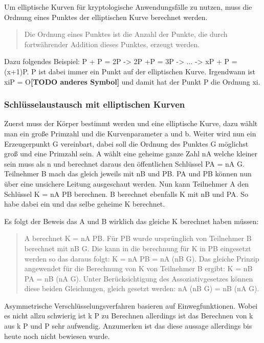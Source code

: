 		Um elliptische Kurven für kryptologische Anwendungsfälle zu nutzen, muss die Ordnung eines Punktes der elliptischen Kurve berechnet werden.
		
		\begin{quote}
			\begin{defi}
				Die Ordnung eines Punktes ist die Anzahl der Punkte, die durch fortwährender Addition dieses Punktes, erzeugt werden.\cite{Information:und:Kommunikation}
			\end{defi}
		\end{quote}
		
		Dazu folgendes Beispiel: P + P = 2P -> 2P +P = 3P -> ... -> xP + P = (x+1)P. P ist dabei immer ein Punkt auf der elliptischen Kurve. Irgendwann ist xiP = O\textbf{[TODO anderes Symbol]} und damit hat der Punkt P die Ordnung xi.
		
		\subsubsection{Schlüsselaustausch mit elliptischen Kurven}
			Zuerst muss der Körper bestimmt werden und eine elliptische Kurve, dazu wählt man ein große Primzahl und die Kurvenparameter a und b. Weiter wird nun ein Erzeugerpunkt G vereinbart, dabei soll die Ordnung des Punktes G möglichst groß und eine Primzahl sein. A wählt eine geheime ganze Zahl nA welche kleiner sein muss als n und berechnet daraus den öffentlichen Schlüssel PA = nA \mycdot G. Teilnehmer B mach das gleich jeweils mit nB und PB. PA und PB können nun über eine unsichere Leitung ausgeschaut werden. Nun kann Teilnehmer A den Schlüssel K = nA \mycdot PB berechnen. B berechnet ebenfalls K mit nB und PA. So habe dabei ein und das selbe geheime K berechnet.
			
			Es folgt der Beweis das A und B wirklich das gleiche K berechnet haben müssen:
			\begin{quote}
				\begin{beweis}
					A berechnet K = nA \mycdot PB. Für PB wurde ursprünglich von Teilnehmer B berechnet mit nB \mycdot G. Die kann in die berechnung für K in PB eingesetzt werden so das daraus folgt: K = nA \mycdot PB = nA \mycdot (nB \mycdot G). Das gleiche Prinzip angewendet für die Berechnung von K von Teilnehmer B ergibt: K = nB \mycdot PA = nB \mycdot (nA \mycdot G). Unter Berücksichtigung des Assoziativgesetzes können diese beiden Gleichungen, gleich gesetzt werden: nA \mycdot (nB \mycdot G) = nB \mycdot (nA \mycdot G).
				\end{beweis}
			\end{quote}
			
			Asymmetrische Verschlüsselungsverfahren basieren auf Einwegfunktionen. Wobei es nicht allzu schwierig ist k \mycdot P zu Berechnen allerdings ist das Berechnen von k aus k \mycdot P und P sehr aufwendig. Anzumerken ist das diese aussage allerdings bis heute noch nicht bewiesen wurde.